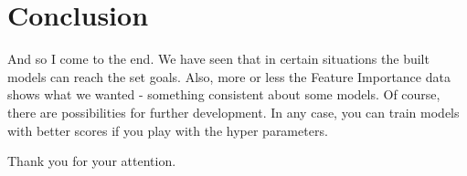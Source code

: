 \documentclass[margin=0.01in]{article}
\begin{document}
\section{Conclusion}
\label{sec:org26647d7}
And so I come to the end. We have seen that in certain situations the built models can reach the set goals. Also, more or less the Feature Importance data shows what we wanted - something consistent about some models. Of course, there are possibilities for further development. In any case, you can train models with better scores if you play with the hyper parameters.

Thank you for your attention.





\newpage
\setcounter{tocdepth}{2}
\tableofcontents
\end{document}
